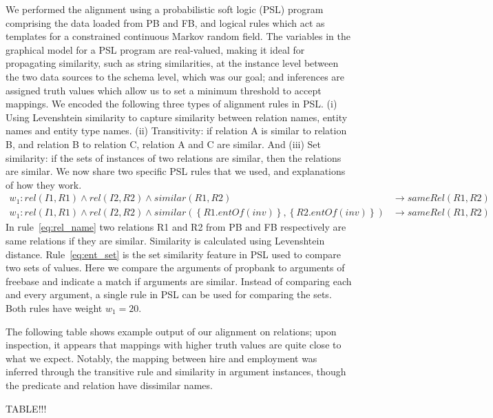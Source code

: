 We performed the alignment using a probabilistic soft logic (PSL) program~\cite{brocheler_probabilistic_2012} comprising the data loaded from PB and FB, and logical rules which act as templates for a constrained continuous Markov random field.
The variables in the graphical model for a PSL program are real-valued, making it ideal for propagating similarity, such as string similarities, at the instance level between the two data sources to the schema level, which was our goal; and inferences are assigned truth values which allow us to set a minimum threshold to accept mappings.
We encoded the following three types of alignment rules in PSL.
(i) Using Levenshtein similarity to capture similarity between relation names, entity names and entity type names.
(ii) Transitivity:  if relation A is similar to relation B, and relation B to relation C, relation A and C are similar.
And (iii) Set similarity:  if the sets of instances of two relations are similar, then the relations are similar.
We now share two specific PSL rules that we used, and explanations of how they work.
\begin{align}
w_{1}: rel(I1,R1)\wedge rel(I2,R2) \wedge similar(R1,R2)&\rightarrow sameRel(R1,R2) \label{eq:rel_name}\\
w_{1}: rel(I1,R1)\wedge rel(I2,R2) \wedge similar(\left\{R1.entOf(inv)\right\},\left\{R2.entOf(inv)\right\}) &\rightarrow sameRel(R1, R2) \label{eq:ent_set}
\end{align}
In rule~\eqref{eq:rel_name} two relations R1 and R2 from PB and FB respectively are same relations if they are similar. Similarity is calculated using Levenshtein distance.
Rule~\eqref{eq:ent_set} is the set similarity feature in PSL used to compare two sets of values.
Here we compare the arguments of propbank to arguments of freebase and indicate a match if arguments are similar.
Instead of comparing each and every argument, a single rule in PSL can be used for comparing the sets.
Both rules have weight $w_1 = 20$.

The following table shows example output of our alignment on relations; upon inspection, it appears that mappings with higher truth values are quite close to what we expect.
Notably, the mapping between hire and employment was inferred through the transitive rule and similarity in argument instances, though the predicate and relation have dissimilar names.

TABLE!!!




